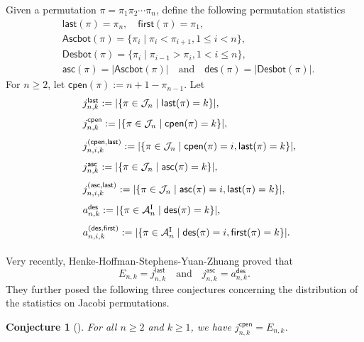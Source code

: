 \documentclass[12pt]{article}
\numberwithin{equation}{section}
\theoremstyle{plain}
\newtheorem{conjecture}[theorem]{Conjecture}
\def\des{\mathsf{des}}
\def\asc{\mathsf{asc}}
\def\Ascbot{\mathsf{Ascbot}}
\def\Desbot{\mathsf{Desbot}}
\def\cpen{\mathsf{cpen}}
\def\first{\mathsf{first}}
\def\last{\mathsf{last}}
\begin{document}
   
   Given a permutation $\pi=\pi_1\pi_2\cdots \pi_n$,  define the following permutation statistics
   \begin{align*}
   	&\last(\pi)=\pi_n, \quad \first(\pi)=\pi_1,\\
   	& \Ascbot(\pi)=\{\pi_i\mid \pi_i<\pi_{i+1}, 1\leq i<n\}, \\
   	& \Desbot(\pi)=\{\pi_i\mid \pi_{i-1}>\pi_{i}, 1< i\leq n\},\\
	&\asc(\pi)=|\Ascbot(\pi)|\quad\text{and}\quad\des(\pi)=|\Desbot(\pi)|.
   	\end{align*}
    For $n\geq 2$, let $\cpen(\pi):=n+1-\pi_{n-1}$. 
Let
   $$
   \begin{array}{ll}
   		\vspace{8pt}
   	& j^{\last}_{n,k}:=|\{\pi\in \mathcal{J}_n\mid \last(\pi)=k\}|,\\
   	\vspace{8pt}
  & j^{\cpen}_{n,k}:=|\{\pi\in \mathcal{J}_n\mid \cpen(\pi)=k\}|,\\
 \vspace{8pt}
  & j^{(\cpen, \last)}_{n,i,k}:=|\{\pi\in \mathcal{J}_n\mid \cpen(\pi)=i, \last(\pi)=k\}|,\\
  \vspace{8pt}
  & j^{\asc}_{n,k}:=|\{\pi\in \mathcal{J}_n\mid \asc(\pi)=k\}|,\\
  \vspace{8pt}
   & j^{(\asc, \last)}_{n,i,k}:=|\{\pi\in \mathcal{J}_n\mid \asc(\pi)=i, \last(\pi)=k\}|,\\
    \vspace{8pt}
   & a^{\des}_{n,k}:=|\{\pi\in \mathcal{A}^{\mathrm{I}}_n\mid \des(\pi)=k\}|,\\
    \vspace{8pt}
  & a^{(\des, \first)}_{n,i,k}:=|\{\pi\in \mathcal{A}^{\mathrm{I}}_n\mid \des(\pi)=i, \first(\pi)=k\}|.\\
   \end{array}
   $$
   Very recently,  Henke-Hoffman-Stephens-Yuan-Zhuang \cite{HHSSY25}  proved that 
   \begin{equation}\label{eq-J-last}
   	E_{n,k}=j^{\last}_{n,k}\quad\text{and}\quad 
    j^{\asc}_{n,k}=a^{\des}_{n,k}.
    \end{equation} They 
   further   posed the following three conjectures concerning the distribution of the statistics  on  Jacobi permutations. 
   
   \begin{conjecture}[] \label{con1} For all $n \ge 2$ and $k \ge 1$, we have $j^{\cpen}_{n,k} = E_{n,k}$.
   	\end{conjecture}
   
\end{document}
